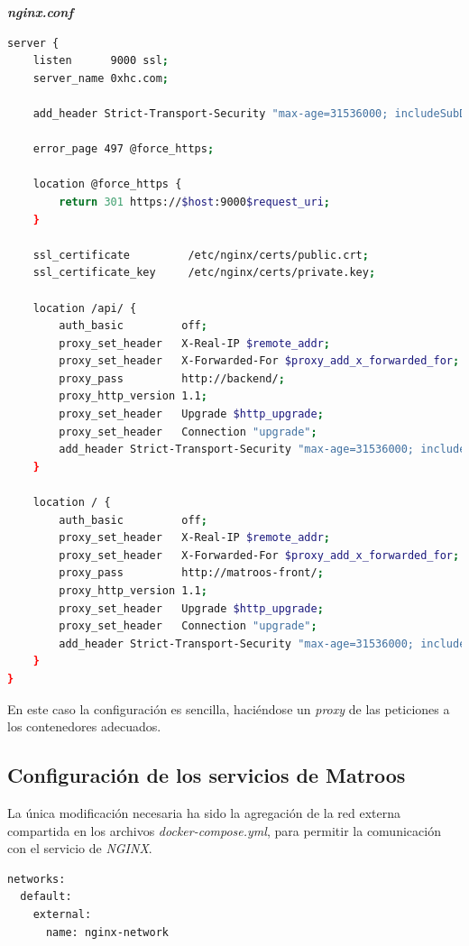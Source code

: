 \bigskip

\textbf{\textit{nginx.conf}}

\begin{lstlisting}[language=sh]
server {
    listen      9000 ssl;
    server_name 0xhc.com;

    add_header Strict-Transport-Security "max-age=31536000; includeSubDomains" always;

    error_page 497 @force_https;

    location @force_https {
        return 301 https://$host:9000$request_uri;
    }

    ssl_certificate         /etc/nginx/certs/public.crt;
    ssl_certificate_key     /etc/nginx/certs/private.key;

    location /api/ {
        auth_basic         off;
        proxy_set_header   X-Real-IP $remote_addr;
        proxy_set_header   X-Forwarded-For $proxy_add_x_forwarded_for;
        proxy_pass         http://backend/;
        proxy_http_version 1.1;
        proxy_set_header   Upgrade $http_upgrade;
        proxy_set_header   Connection "upgrade";
        add_header Strict-Transport-Security "max-age=31536000; includeSubDomains" always;
    }

    location / {
        auth_basic         off;
        proxy_set_header   X-Real-IP $remote_addr;
        proxy_set_header   X-Forwarded-For $proxy_add_x_forwarded_for;
        proxy_pass         http://matroos-front/;
        proxy_http_version 1.1;
        proxy_set_header   Upgrade $http_upgrade;
        proxy_set_header   Connection "upgrade";
        add_header Strict-Transport-Security "max-age=31536000; includeSubDomains" always;
    }
}
\end{lstlisting}

En este caso la configuración es sencilla, haciéndose un \textit{proxy} de las peticiones a los contenedores adecuados.


\subsection{Configuración de los servicios de \textbf{Matroos}}

La única modificación necesaria ha sido la agregación de la red externa compartida en los archivos \textit{docker-compose.yml}, para permitir la comunicación con el servicio de \textit{NGINX}.

\begin{lstlisting}[language=sh]
networks:
  default:
    external:
      name: nginx-network
\end{lstlisting}

